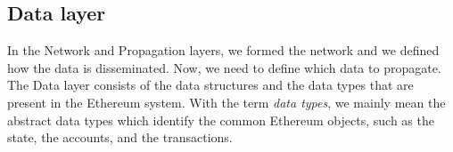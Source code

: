 \subsection{Data layer}

In the Network and Propagation layers, we formed the network and we defined how
the data is disseminated. Now, we need to define which data to propagate. The
Data layer consists of the data structures and the data types that are present
in the Ethereum system. With the term \emph{data types}, we mainly mean the
abstract data types which identify the common Ethereum objects, such as the
state, the accounts, and the transactions.
